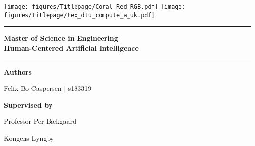 \begin{titlepage}
    \raggedright
    \texttt{[image: figures/Titlepage/Coral\_Red\_RGB.pdf]}
    \hfill
    \texttt{[image: figures/Titlepage/tex\_dtu\_compute\_a\_uk.pdf]}
    \begin{center}
        \vspace{3 cm}
        \hrule
        \vspace{.3cm}
        { \huge {\bfseries {\opgavetitel}}
        } 
        
        \vspace{.1cm}
        { \LARGE {\bfseries 
            {
                Master of Science in Engineering
                \\
                Human-Centered Artificial Intelligence
            }
        }
        }
        \vspace{.5cm}
        
        \hrule
        \vspace{1.5cm}
        
        \textbf{Authors}\\
        \vspace{.5cm}
        \centering
        
        Felix Bo Caspersen | s183319\\
        
        \vspace{1.5cm}
        
        \textbf{Supervised by}\\
        \vspace{.5cm}
        \centering
        
        Professor Per Bækgaard \\
        \vspace{1.5cm}
        
        Kongens Lyngby \\
        \centering \datoen %
    \end{center}
\end{titlepage}